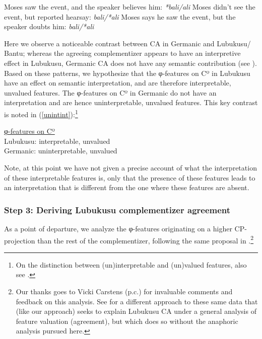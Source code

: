 \documentclass[output=paper
,modfonts
,nonflat
]{langsci/langscibook}
\begin{document}
\begin{xlist}
\ex Moses saw the event, and the speaker believes him: \textit{*bali/ali}
\ex Moses didn't see the event, but reported hearsay: \textit{bali/*ali}
\ex Moses says he saw the event, but the speaker doubts him: \textit{bali/*ali}

\end{xlist}

\z
\noindent
Here we observe a noticeable contrast between CA in Germanic and Lubukusu/ Bantu; whereas the agreeing complementizer appears to have an interpretive effect in Lubukusu, Germanic CA does not have any semantic contribution (see \citealt{vanKoppen:2005,vanKoppen:2017}). Based on these patterns, we hypothesize that the φ-features on Cº in Lubukusu have an effect on semantic interpretation, and are therefore interpretable, unvalued features. The φ-features on Cº in Germanic do not have an interpretation and are hence uninterpretable, unvalued features. This key contrast is noted in (\ref{unintint}):\footnote{On the distinction between (un)interpretable and (un)valued features, also see \citet{Pesetsky:2007}.}

\ea \label{unintint}

\underline{φ-features on Cº} \\
Lubukusu: interpretable, unvalued \\
Germanic: uninterpretable, unvalued

\z
\noindent Note, at this point we have not given a precise account of what the interpretation of these interpretable features is, only that the presence of these features leads to an interpretation that is different from the one where these features are absent.   

\subsubsection{Step 3: Deriving Lubukusu complementizer agreement}

As a point of departure, we analyze the φ-features originating on a higher CP-projection than the rest of the complementizer, following the same proposal in \citet{Carstens:2016}.\footnote{Our thanks goes to Vicki Carstens (p.c.) for invaluable comments and feedback on this analysis. See \citet{Carstens:2016} for a different approach to these same data that (like our approach) seeks to explain Lubukusu CA under a general analysis of feature valuation (agreement), but which does so without the anaphoric analysis pursued here.}
\end{document}
